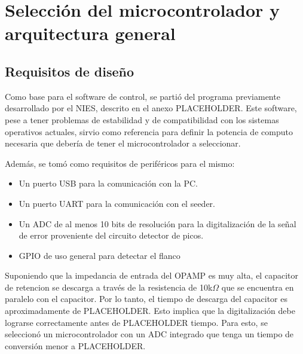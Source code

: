 
\chapter{Selección del microcontrolador y arquitectura general}

\section{Requisitos de diseño}

Como base para el software de control, se partió del programa previamente desarrollado por el NIES, descrito en el anexo PLACEHOLDER. Este software, pese a tener problemas de estabilidad y de compatibilidad con los sistemas operativos actuales, sirvio como referencia para definir la potencia de computo necesaria que debería de tener el microcontrolador a seleccionar. 

Además, se tomó como requisitos de periféricos para el mismo:

\begin{itemize}
    \item Un puerto USB para la comunicación con la PC.
    \item Un puerto UART para la comunicación con el seeder.
    \item Un ADC de al menos 10 bits de resolución para la digitalización de la señal de error proveniente del circuito detector de picos.
    \item GPIO de uso general para detectar el flanco 
\end{itemize}

Suponiendo que la impedancia de entrada del OPAMP es muy alta, el capacitor de retencion se descarga a través de la resistencia de 10k$\Omega$ que se encuentra en paralelo con el capacitor. Por lo tanto, el tiempo de descarga del capacitor es aproximadamente de PLACEHOLDER. Esto implica que la digitalización debe lograrse correctamente antes de PLACEHOLDER tiempo. Para esto, se seleccionó un microcontrolador con un ADC integrado que tenga un tiempo de conversión menor a PLACEHOLDER. 


